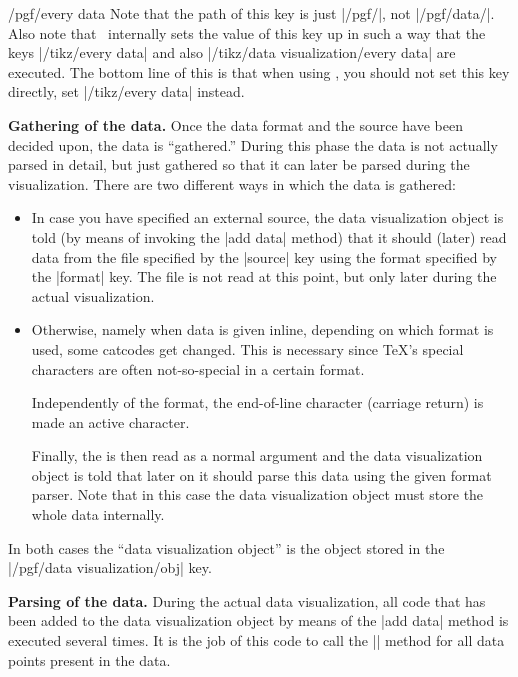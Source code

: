 \begin{command}{\pgfdata{}}
\begin{stylekey}{/pgf/every data}
    Note that the path of this key is just |/pgf/|, not
    |/pgf/data/|. Also note that \tikzname\ internally sets the value
    of this key up in such a way that the keys |/tikz/every data| and
    also |/tikz/data visualization/every data| are executed. The
    bottom line of this is that when using \tikzname, you should not
    set this key directly, set |/tikz/every data| instead.
  \end{stylekey}

  \medskip
  \textbf{Gathering of the data.}
  Once the data format and the source have been decided upon, the data
  is ``gathered.'' During this phase the data is not actually parsed
  in detail, but just gathered so that it can later be parsed during
  the visualization. There are two different ways in which the data is
  gathered:
  \begin{itemize}
  \item In case you have specified an external source, the data
    visualization object is told (by means of invoking the |add data|
    method) that it should (later) read data from  the file specified
    by the |source| key using the format specified
    by the |format| key. The file is not read at this point, but only
    later during the actual visualization.
  \item Otherwise, namely when data is given inline, depending on
    which format is used, some catcodes get changed. This is necessary
    since \TeX's special characters are often not-so-special in a
    certain format.

    Independently of the format, the end-of-line character
    (carriage return) is made an active character.

    Finally, the  is then read as a normal argument
    and the data visualization object is told that later on it should
    parse this data using the given format parser. Note that in this
    case the data visualization object must store the whole data
    internally.
  \end{itemize}
  In both cases the ``data visualization object'' is the object stored
  in the |/pgf/data visualization/obj| key.

  \medskip
  \textbf{Parsing of the data.}
  During the actual data visualization, all code that has been added
  to the data visualization object by means of the |add data| method
  is executed several times. It is the job of this code to call the
  |\pgfdatapoint| method for all data points present in the data.


\end{command}
